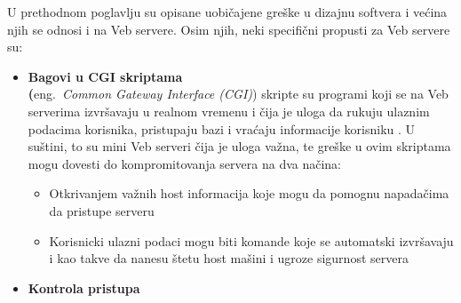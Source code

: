 \documentclass[a4paper]{article}
\begin{document}
\indent U prethodnom poglavlju su opisane uobičajene greške u dizajnu softvera i većina njih se odnosi i na Veb servere. Osim njih, neki specifični propusti za Veb servere su:  
\begin{itemize}
    \item \textbf{Bagovi u CGI skriptama }\\
    \textbf({eng.~{\em  Common Gateway Interface (CGI)}}) skripte su programi koji se na Veb serverima izvršavaju u realnom vremenu i čija je uloga da rukuju ulaznim podacima korisnika, pristupaju bazi i vraćaju informacije korisniku \cite{lawsa}. U suštini, to su mini Veb serveri čija je uloga važna, te greške u ovim skriptama mogu dovesti do kompromitovanja servera na dva načina:
    \begin{itemize}
    \item
        Otkrivanjem važnih host informacija koje mogu da pomognu napadačima da pristupe serveru 
    
    \item
       Korisnicki ulazni podaci mogu biti komande koje se automatski izvršavaju i kao takve da nanesu štetu host mašini i ugroze sigurnost servera 
        
    \end{itemize}
    
    
     \item \textbf{ Kontrola pristupa }  
     

\end{itemize}
\end{document}
